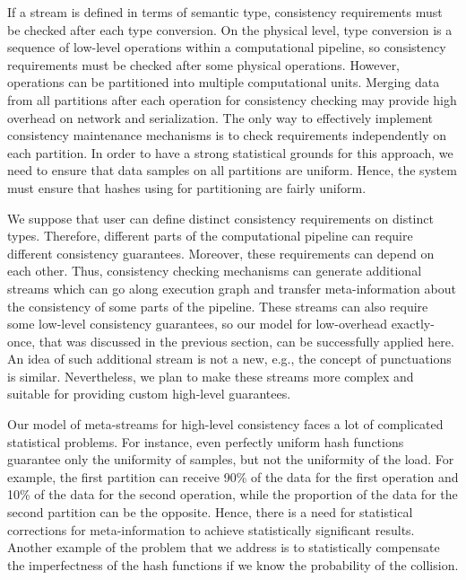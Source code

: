 If a stream is defined in terms of semantic type, consistency requirements must be checked after each type conversion. On the physical level, type conversion is a sequence of low-level operations within a computational pipeline, so consistency requirements must be checked after some physical operations. However, operations can be partitioned into multiple computational units. Merging data from all partitions after each operation for consistency checking may provide high overhead on network and serialization. The only way to effectively implement consistency maintenance mechanisms is to check requirements independently on each partition. In order to have a strong statistical grounds for this approach, we need to ensure that data samples on all partitions are uniform. Hence, the system must ensure that hashes using for partitioning are fairly uniform.

We suppose that user can define distinct consistency requirements on distinct types. Therefore, different parts of the computational pipeline can require different consistency guarantees. Moreover, these requirements can depend on each other. Thus, consistency checking mechanisms can generate additional streams which can go along execution graph and transfer meta-information about the consistency of some parts of the pipeline. These streams can also require some low-level consistency guarantees, so our model for low-overhead exactly-once, that was discussed in the previous section, can be successfully applied here. An idea of such additional stream is not a new, e.g., the concept of punctuations~\cite{Tucker:2003:EPS:776752.776780} is similar. Nevertheless, we plan to make these streams more complex and suitable for providing custom high-level guarantees.

Our model of meta-streams for high-level consistency faces a lot of complicated statistical problems. For instance, even perfectly uniform hash functions guarantee only the uniformity of samples, but not the uniformity of the load. For example, the first partition can receive 90\% of the data for the first operation and 10\% of the data for the second operation, while the proportion of the data for the second partition can be the opposite. Hence, there is a need for statistical corrections for meta-information to achieve statistically significant results. Another example of the problem that we address is to statistically compensate the imperfectness of the hash functions if we know the probability of the collision.  